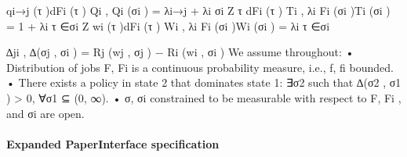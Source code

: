 \documentclass[10pt]{article}
\begin{document}
\begin{ReviewVerbatim}

qi→j (τ )dFi (τ )
Qi , Qi (σi ) = λi→j + λi
σi
Z
τ dFi (τ )
Ti , λi Fi (σi )Ti (σi ) = 1 + λi
τ ∈σi
Z
wi (τ )dFi (τ )
Wi , λi Fi (σi )Wi (σi ) = λi
τ ∈σi

∆ji , ∆(σj , σi ) = Rj (wj , σj ) − Ri (wi , σi )
We assume throughout:
• Distribution of jobs F, Fi is a continuous probability measure, i.e., f, fi bounded.
• There exists a policy in state 2 that dominates state 1: ∃σ2 such that ∆(σ2 , σ1 ) > 0, ∀σ1 ⊆
(0, ∞).
• σ, σi constrained to be measurable with respect to F, Fi , and σi are open.
\end{ReviewVerbatim}


\paragraph{Expanded PaperInterface specification}
\end{document}
